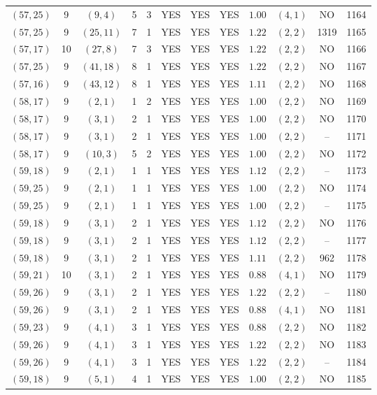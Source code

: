 \begin{longtable}{|c|c|c|c|c|c|c|c|c|c|c|c|}
$(57,25)$ & 9 & $(9,4)$ & 5 & 3 & YES & YES & YES & $1.00$ & $(4,1)$ & NO & 1164\\
$(57,25)$ & 9 & $(25,11)$ & 7 & 1 & YES & YES & YES & $1.22$ & $(2,2)$ & 1319 & 1165\\
$(57,17)$ & 10 & $(27,8)$ & 7 & 3 & YES & YES & YES & $1.22$ & $(2,2)$ & NO & 1166\\
$(57,25)$ & 9 & $(41,18)$ & 8 & 1 & YES & YES & YES & $1.22$ & $(2,2)$ & NO & 1167\\
$(57,16)$ & 9 & $(43,12)$ & 8 & 1 & YES & YES & YES & $1.11$ & $(2,2)$ & NO & 1168\\
$(58,17)$ & 9 & $(2,1)$ & 1 & 2 & YES & YES & YES & $1.00$ & $(2,2)$ & NO & 1169\\
$(58,17)$ & 9 & $(3,1)$ & 2 & 1 & YES & YES & YES & $1.00$ & $(2,2)$ & NO & 1170\\
$(58,17)$ & 9 & $(3,1)$ & 2 & 1 & YES & YES & YES & $1.00$ & $(2,2)$ & -- & 1171\\
$(58,17)$ & 9 & $(10,3)$ & 5 & 2 & YES & YES & YES & $1.00$ & $(2,2)$ & NO & 1172\\
$(59,18)$ & 9 & $(2,1)$ & 1 & 1 & YES & YES & YES & $1.12$ & $(2,2)$ & -- & 1173\\
$(59,25)$ & 9 & $(2,1)$ & 1 & 1 & YES & YES & YES & $1.00$ & $(2,2)$ & NO & 1174\\
$(59,25)$ & 9 & $(2,1)$ & 1 & 1 & YES & YES & YES & $1.00$ & $(2,2)$ & -- & 1175\\
$(59,18)$ & 9 & $(3,1)$ & 2 & 1 & YES & YES & YES & $1.12$ & $(2,2)$ & NO & 1176\\
$(59,18)$ & 9 & $(3,1)$ & 2 & 1 & YES & YES & YES & $1.12$ & $(2,2)$ & -- & 1177\\
$(59,18)$ & 9 & $(3,1)$ & 2 & 1 & YES & YES & YES & $1.11$ & $(2,2)$ & 962 & 1178\\
$(59,21)$ & 10 & $(3,1)$ & 2 & 1 & YES & YES & YES & $0.88$ & $(4,1)$ & NO & 1179\\
$(59,26)$ & 9 & $(3,1)$ & 2 & 1 & YES & YES & YES & $1.22$ & $(2,2)$ & -- & 1180\\
$(59,26)$ & 9 & $(3,1)$ & 2 & 1 & YES & YES & YES & $0.88$ & $(4,1)$ & NO & 1181\\
$(59,23)$ & 9 & $(4,1)$ & 3 & 1 & YES & YES & YES & $0.88$ & $(2,2)$ & NO & 1182\\
$(59,26)$ & 9 & $(4,1)$ & 3 & 1 & YES & YES & YES & $1.22$ & $(2,2)$ & NO & 1183\\
$(59,26)$ & 9 & $(4,1)$ & 3 & 1 & YES & YES & YES & $1.22$ & $(2,2)$ & -- & 1184\\
$(59,18)$ & 9 & $(5,1)$ & 4 & 1 & YES & YES & YES & $1.00$ & $(2,2)$ & NO & 1185\\

\end{longtable}
